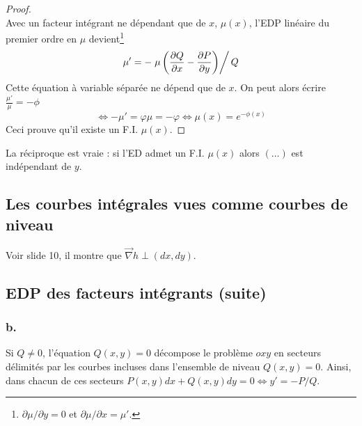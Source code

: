 	
	
	
	\begin{proof}\ \\
	Avec un facteur 
	intégrant ne dépendant que de $x$, $\mu(x)$, l'EDP linéaire du premier 
	ordre en $\mu$ devient\footnote{$\partial \mu/\partial y = 0$ et $
	\partial\mu/\partial x = \mu'$.}
	\begin{equation}
	\mu' = -\left.\mu\left(\frac{\partial Q}{\partial x}-\frac{\partial P}{
	\partial y}\right)\right/Q
	\end{equation}
	Cette équation à variable séparée ne dépend que de $x$. On peut alors 
	écrire $\frac{\mu'}{\mu} = -\phi$ 
	\begin{equation}
	\Leftrightarrow -\mu'=\varphi\mu =-\varphi 
	\Leftrightarrow \mu(x) = e^{-\phi(x)}
	\end{equation}
	Ceci prouve qu'il existe un F.I. $\mu(x)$.
	\end{proof}
	La réciproque est vraie : si l'ED admet un F.I. $\mu(x)$ alors $(\dots)$ 
	est indépendant de $y$.
	
\setcounter{section}{1}
\setcounter{subsection}{4}
	\subsection{Les courbes intégrales vues comme courbes de niveau}
	Voir slide 10, il montre que $\vec\nabla h \perp (dx,dy)$.

\setcounter{section}{2}
\setcounter{subsection}{2}
	\subsection{EDP des facteurs intégrants (suite)}
	\subsubsection{b.}
	Si $Q\neq0$, l'équation $Q(x,y)=0$ décompose le problème $oxy$ en 
	secteurs délimités par les courbes incluses dans l'ensemble de 
	niveau $Q(x,y)=0$. Ainsi, dans chacun de ces secteurs $P(x,y)dx + 
	Q(x,y)dy = 0 \Leftrightarrow y' = -P/Q$.\\
	
